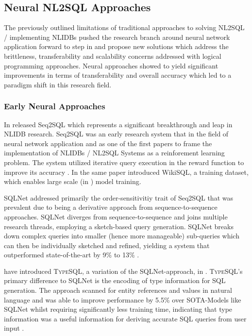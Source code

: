 \subsection{Neural NL2SQL Approaches}


The previously outlined limitations of traditional approaches to solving NL2SQL / implementing NLIDBs pushed the research
branch around neural network application forward to step in and propose new solutions which address the brittleness, 
transferability and scalability concerns addressed with logical programming approaches. Neural approaches showed to yield
significant improvements in terms of transferability and overall accuracy which led to a paradigm shift in this research
field.

\subsubsection{Early Neural Approaches}

In \citeyear{Seq2SQL} \citeauthor*{Seq2SQL} released Seq2SQL which represents a significant breakthrough and leap in NLIDB 
research. Seq2SQL was an early research system that in the field of neural network application and as one of the first papers
to frame the implementation of NLIDBs / NL2SQL Systems as a reinforement learning problem. The system utilized iterative query 
execution in the reward function to improve its accuracy \citep{Seq2SQL}. In the same paper \citeauthor*{Seq2SQL} introduced 
WikiSQL, a training dataset, which enables large scale (in \citeyear{Seq2SQL}) model training.

SQLNet \citep{SQLNet} addressed primarily the order-sensitivitiy trait of Seq2SQL \citep{Seq2SQL} that was prevalent due to being
a derivative approach from sequence-to-sequence approaches. SQLNet diverges from sequence-to-sequence and joins multiple research 
threads, employing a sketch-based query generation. SQLNet breaks down complex queries into smaller (hence more manageable)
sub-queries which can then be individually sketched and refined, yielding a system that outperformed state-of-the-art by 9\% 
to 13\% \citep{SQLNet}.

\citeauthor*{TypeSQL} have introduced \textsc{TypeSQL}, a variation of the SQLNet-approach, in \citeyear{TypeSQL}.
\textsc{TypeSQL}'s primary difference to SQLNet is the encoding of type information for SQL generation. The approach scanned
for entity references and values in natural language and was able to improve performance by 5.5\% over SOTA-Models like
SQLNet whilst requiring significantly less training time, indicating that type information was a useful information for deriving 
accurate SQL queries from user input \citep{TypeSQL}.

